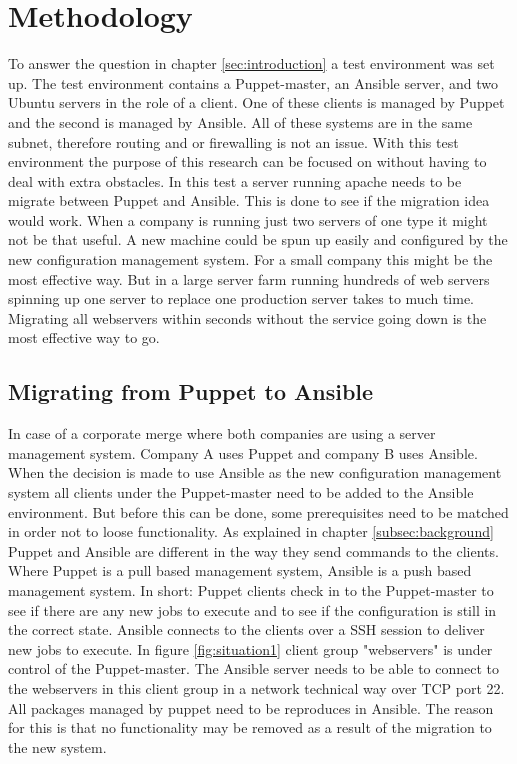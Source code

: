 \section{Methodology}\label{sec:methodology}

To answer the question in chapter \ref{sec:introduction} a test environment was set up. The test environment contains a Puppet-master, an Ansible server, and two Ubuntu servers in the role of a  client. One of these clients is managed by Puppet and the second is managed by Ansible. All of these systems are in the same subnet, therefore routing and or firewalling is not an issue. With this test environment the purpose of this research can be focused on without having to deal with extra obstacles.  
In this test a server running apache needs to be  migrate between Puppet and Ansible. This is done to see if the migration idea would work. When a company is running just two servers of one type it might not be that useful. A new machine could be spun up easily and configured by the new configuration management system. For a small company this might be the most effective way. But in a large server farm running hundreds of web servers spinning up one server to replace one production server takes to much time. Migrating all webservers within seconds without the service going down is the most effective way to go.  

\subsection{Migrating from Puppet to Ansible}\label{subsec:puppettoansible}

In case of a corporate merge where both companies are using a server management system. Company A uses Puppet and company B uses Ansible. When the decision is made to use Ansible as the new configuration management system all clients under the Puppet-master need to be added to the Ansible environment. But before this can be done, some prerequisites need to be matched in order not to loose functionality.
As explained in chapter \ref{subsec:background} Puppet and Ansible are different in the way they send commands to the clients. Where Puppet is a pull based management system, Ansible is a push based management system. In short: Puppet clients check in to the Puppet-master to see if there are any new jobs to execute and to see if the configuration is still in the correct state. Ansible connects to the clients over a SSH session to deliver new jobs to execute. In figure \ref{fig:situation1} client group "webservers" is under control of the Puppet-master. The Ansible server needs to be able to connect to the webservers in this client group in a network technical way over TCP port 22. All packages managed by puppet need to be reproduces in Ansible. The reason for this is that no functionality may be removed as a result of the migration to the new system. 

